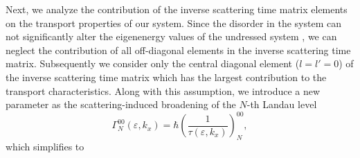 Next, we analyze the contribution of the inverse scattering time matrix elements on the transport properties of our system.
Since the disorder in the system can not significantly alter the eigenenergy values of the undressed system \cite{wackerl20}, we can neglect the contribution of all off-diagonal elements in the inverse scattering time matrix. Subsequently we consider only the central diagonal element (${l=l'=0}$) of the inverse scattering time matrix which has the largest contribution to the transport characteristics. Along with this assumption, we introduce a new parameter as the scattering-induced broadening of the $N$-th Landau level \cite{dini16,endo09}
\begin{equation} \label{eq:16}
 \Gamma^{00}_{N}(\varepsilon,k_x) =
 \hbar \left(\frac{1}{\tau(\varepsilon,k_x)}\right)^{00}_N,
\end{equation}
which simplifies to
